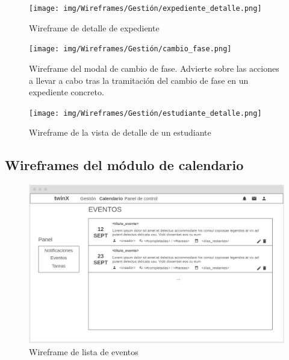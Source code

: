 \begin{figure}
	\centering
	\texttt{[image: img/Wireframes/Gestión/expediente\_detalle.png]}
	\caption{Wireframe de detalle de expediente}
	\label{fig:expediente_detalleWF}
\end{figure}

\begin{figure}
	\centering
	\texttt{[image: img/Wireframes/Gestión/cambio\_fase.png]}
	\caption[Wireframe del modal de cambio de fase]{Wireframe del modal de cambio de fase. Advierte sobre las acciones a llevar a cabo tras la tramitación del cambio de fase en un expediente concreto.}
	\label{fig:cambio_faseWF}
\end{figure}

\begin{figure}
	\centering
	\texttt{[image: img/Wireframes/Gestión/estudiante\_detalle.png]}
	\caption{Wireframe de la vista de detalle de un estudiante}
	\label{fig:estudiante_detalleWF}
\end{figure}

\newpage

\subsection{Wireframes del módulo de calendario}

\begin{figure}
	\centering
	\includegraphics[width=\textwidth]{img/Wireframes/Calendario/eventos_lista.png}
	\caption{Wireframe de lista de eventos}
	\label{fig:eventos_listaWF}
\end{figure}

